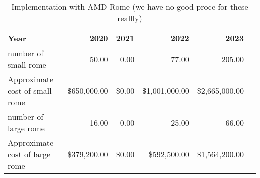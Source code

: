 \tiny \begin{longtable} { |p{}  |r  |r  |r  |r  |r |} 
\caption{Implementation with AMD Rome (we have no good proce for these reallly) \label{tab:Rome}}\\ 
\hline 
\textbf{Year}&\textbf{2020}&\textbf{2021}&\textbf{2022}&\textbf{2023} \\ \hline
{number of small rome }&{50.00}&{0.00}&{77.00}&{205.00} \\ \hline
{Approximate cost of small rome }&{\$650,000.00}&{\$0.00}&{\$1,001,000.00}&{\$2,665,000.00} \\ \hline
{number of large rome }&{16.00}&{0.00}&{25.00}&{66.00} \\ \hline
{Approximate cost of large rome }&{\$379,200.00}&{\$0.00}&{\$592,500.00}&{\$1,564,200.00} \\ \hline
\end{longtable} \normalsize

